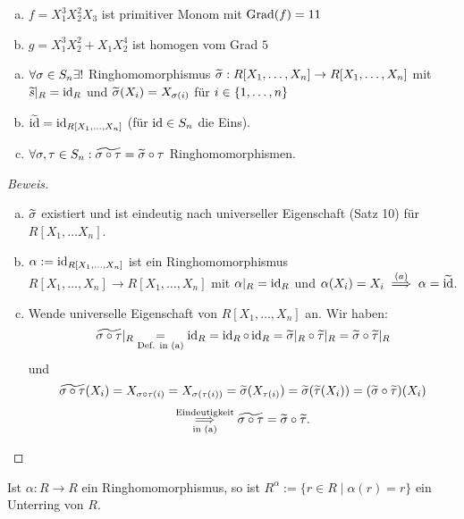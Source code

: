 \documentclass[a4paper]{report}
\begin{document}
\begin{bsp*}
\begin{enumerate}[(a)]
  \item $f = X_{1}^{3}X_{2}^{2}X_{3}$ ist primitiver Monom mit $\operatorname{Grad}(f) = 11$
  \item $g = X_{1}^{3}X_{2}^{2} + X_{1}X_{2}^{4}$ ist homogen vom Grad $5$
\end{enumerate}
\end{bsp*}

\begin{lemm}
\begin{enumerate}[(a)]
  \item $\forall \sigma \in S_n \exists !$ Ringhomomorphismus $\widetilde {\sigma} : R[X_{1}, \ldots, X_{n}] \to R[X_{1}, \ldots, X_{n}]$ mit $\widetilde s|_{R} = \operatorname{id}_{R}$ und $\widetilde {\sigma}(X_{i}) = X_{\sigma(i)}$ für $i \in \{1, \ldots, n\}$
  \item $\widetilde{\operatorname{id}} = \operatorname{id}_{R[X_{1}, \ldots, X_{n}]}$ (für $\operatorname{id} \in S_n$ die Eins).
  \item $\forall \sigma, \tau \in S_n : \widetilde{\sigma \circ \tau} = \widetilde {\sigma} \circ \tau$ Ringhomomorphismen.
\end{enumerate}
\begin{proof}[Beweis]
\begin{enumerate}[(a)]
  \item $\widetilde {\sigma}$ existiert und ist eindeutig nach universeller Eigenschaft (Satz 10) für $R[X_{1}, \ldots X_{n}]$.
  \item $\alpha:= \operatorname{id}_{R[X_{1}, \ldots, X_{n}]}$ ist ein Ringhomomorphismus $R[X_{1}, \ldots, X_{n}] \to R[X_{1}, \ldots, X_{n}]$ mit $\alpha|_{R} = \operatorname{id}_{R}$ und $\alpha(X_{i}) = X_i \overset{(a)}{\implies} \alpha = \widetilde {\operatorname{id}}$.
  \item Wende universelle Eigenschaft von $R[X_{1}, \ldots, X_{n}]$ an. Wir haben:
        \[\widetilde{\sigma \circ \tau}|_{R} \underset{\text{Def. in (a)}}= \operatorname{id}_{R} = \operatorname{id}_{R} \circ \operatorname{id}_{R} = \widetilde {\sigma}|_{R} \circ \widetilde \tau|_{R} = \widetilde {\sigma} \circ \widetilde \tau |_{R}\]
        und
        \[\widetilde{\sigma \circ \tau}(X_{i})= X_{\sigma \circ \tau(i)} = X_{\sigma(\tau(i))} = \widetilde {\sigma}(X_{\tau(i)}) = \widetilde {\sigma}(\widetilde \tau(X_{i})) = (\widetilde {\sigma} \circ \widetilde \tau)(X_{i})\]
        \[ \overunderset{\text{Eindeutigkeit}}{\text{in (a)}} \imp \tilde{\s \circ \tau} = \tilde \s \circ \tilde \tau. \qedhere\]
\end{enumerate}
\end{proof}
\end{lemm}

\begin{bem*}[Übung] Ist $\alpha : R \to R$ ein Ringhomomorphismus, so ist $R^{\alpha} := \{r \in R \mid \alpha(r) = r\}$ ein Unterring von $R$.

\end{bem*}
\end{document}
